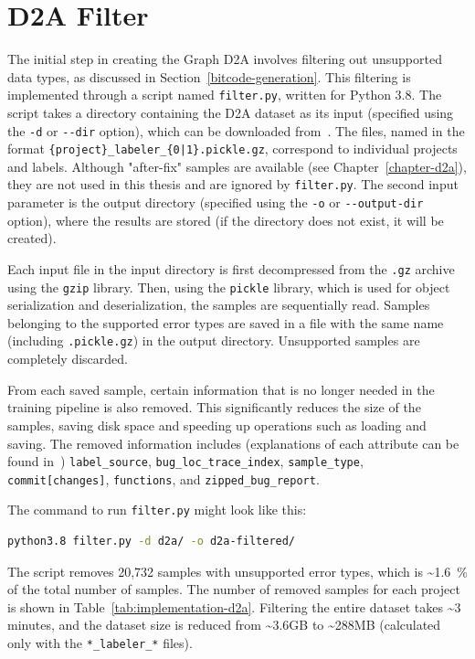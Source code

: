 \section{D2A Filter}
\label{implementation-d2a-filter}
The initial step in creating the Graph D2A involves filtering out unsupported data types, as discussed in Section~\ref{bitcode-generation}. This filtering is implemented through a script named \texttt{filter.py}, written for Python 3.8. The script takes a directory containing the D2A dataset as its input (specified using the \texttt{-d} or \texttt{-{}-dir} option), which can be downloaded from~\cite{D2A-webpage}. The files, named in the format \texttt{\{project\}\_labeler\_\{0|1\}.pickle.gz}, correspond to individual projects and labels. Although "after-fix" samples are available (see Chapter~\ref{chapter-d2a}), they are not used in this thesis and are ignored by \texttt{filter.py}. The second input parameter is the output directory (specified using the \texttt{-o} or \texttt{-{}-output-dir} option), where the results are stored (if the directory does not exist, it will be created).

Each input file in the input directory is first decompressed from the \texttt{.gz} archive using the \texttt{gzip} library. Then, using the \texttt{pickle} library, which is used for object serialization and deserialization, the samples are sequentially read. Samples belonging to the supported error types are saved in a file with the same name (including \texttt{.pickle.gz}) in the output directory. Unsupported samples are completely discarded.

From each saved sample, certain information that is no longer needed in the training pipeline is also removed. This significantly reduces the size of the samples, saving disk space and speeding up operations such as loading and saving. The removed information includes (explanations of each attribute can be found in~\cite{d2a-sample-description}) \texttt{label\_source}, \texttt{bug\_loc\_trace\_index}, \texttt{sample\_type}, \texttt{commit[changes]}, \texttt{functions}, and \texttt{zipped\_bug\_report}.

The command to run \texttt{filter.py} might look like this:
\begin{lstlisting}[language=bash, xleftmargin=2em]
python3.8 filter.py -d d2a/ -o d2a-filtered/
\end{lstlisting}

The script removes 20,732 samples with unsupported error types, which is \textasciitilde1.6~\% of the total number of samples. The number of removed samples for each project is shown in Table~\ref{tab:implementation-d2a}. Filtering the entire dataset takes \textasciitilde3 minutes, and the dataset size is reduced from \textasciitilde3.6GB to \textasciitilde288MB (calculated only with the \texttt{*\_labeler\_*} files).


